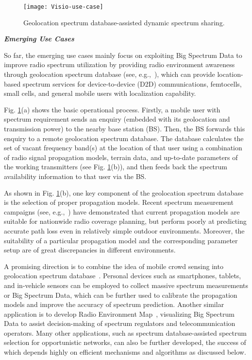 \documentclass[12pt,draftcls,journal,letterpaper,oneside,onecolumn]{IEEEtran}
\begin{document}
\begin{figure}[!t]
\centering
\texttt{[image: Visio-use-case]}
\caption{Geolocation spectrum database-assisted dynamic spectrum sharing.}
\label{Visio-use-case}
\end{figure}


\textbf{\emph{Emerging Use Cases}}

So far, the emerging use cases mainly focus on exploiting Big Spectrum Data to improve radio spectrum utilization by providing radio environment awareness through geolocation spectrum database (see, e.g.,~\cite{Senseless_2012}), which can provide location-based spectrum services for device-to-device (D2D) communications, femtocells, small cells, and general mobile users with localization capability.

Fig. \ref{Visio-use-case}(a) shows the basic operational process. Firstly, a mobile user with spectrum requirement sends an enquiry (embedded with its geolocation and transmission power) to the nearby base station (BS). Then, the BS forwards this enquiry to a remote geolocation spectrum database. The database calculates the set of vacant frequency band(s) at the location of that user using a combination of radio signal propagation models, terrain data, and up-to-date parameters of the working transmitters (see Fig. \ref{Visio-use-case}(b)), and then feeds back the spectrum availability information to that user via the BS.

As shown in Fig. \ref{Visio-use-case}(b), one key component of the geolocation spectrum database is the selection of proper propagation models. Recent spectrum measurement campaigns (see, e.g.,~\cite{survey_PathLoss}) have demonstrated that current propagation models are suitable for nationwide radio coverage planning, but perform poorly at predicting accurate path loss even in relatively simple outdoor environments. Moreover, the suitability of a particular propagation model and the corresponding parameter setup are of great discrepancies in different environments.

A promising direction is to combine the idea of mobile crowd sensing into geolocation spectrum database~\cite{JSAC-D2D}. Personal devices such as smartphones, tablets, and in-vehicle sensors can be employed to collect massive spectrum measurements or Big Spectrum Data, which can be further used to calibrate the propagation models and improve the accuracy of spectrum prediction. Another similar application is to develop Radio Environment Map~\cite{REM-MassiveData}, visualizing Big Spectrum Data to assist decision-making of spectrum regulators and telecommunication operators. Many other applications, such as spectrum database-assisted spectrum selection for opportunistic networks, can also be further developed, the success of which depends highly on efficient mechanisms and algorithms as discussed below.\\
\end{document}
